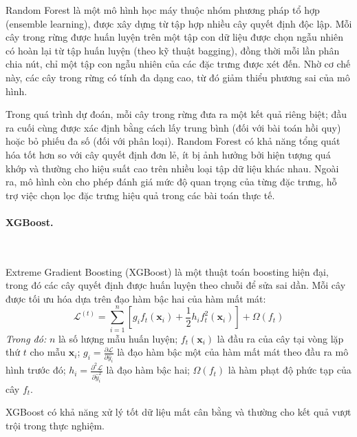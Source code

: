 \vspace{0.5em}

Random Forest là một mô hình học máy thuộc nhóm phương pháp tổ hợp (ensemble learning), được xây dựng từ tập hợp nhiều cây quyết định độc lập. Mỗi cây trong rừng được huấn luyện trên một tập con dữ liệu được chọn ngẫu nhiên có hoàn lại từ tập huấn luyện (theo kỹ thuật bagging), đồng thời mỗi lần phân chia nút, chỉ một tập con ngẫu nhiên của các đặc trưng được xét đến. Nhờ cơ chế này, các cây trong rừng có tính đa dạng cao, từ đó giảm thiểu phương sai của mô hình.

Trong quá trình dự đoán, mỗi cây trong rừng đưa ra một kết quả riêng biệt; đầu ra cuối cùng được xác định bằng cách lấy trung bình (đối với bài toán hồi quy) hoặc bỏ phiếu đa số (đối với phân loại). Random Forest có khả năng tổng quát hóa tốt hơn so với cây quyết định đơn lẻ, ít bị ảnh hưởng bởi hiện tượng quá khớp và thường cho hiệu suất cao trên nhiều loại tập dữ liệu khác nhau. Ngoài ra, mô hình còn cho phép đánh giá mức độ quan trọng của từng đặc trưng, hỗ trợ việc chọn lọc đặc trưng hiệu quả trong các bài toán thực tế.


\vspace{0.5em}

\paragraph{XGBoost.}~

\vspace{0.5em}

Extreme Gradient Boosting (XGBoost) là một thuật toán boosting hiện đại, trong đó các cây quyết định được huấn luyện theo chuỗi để sửa sai dần. Mỗi cây được tối ưu hóa dựa trên đạo hàm bậc hai của hàm mất mát:
\[
\mathcal{L}^{(t)} = \sum_{i=1}^n \left[ g_i f_t(\mathbf{x}_i) + \frac{1}{2} h_i f_t^2(\mathbf{x}_i) \right] + \Omega(f_t)
\]
\textit{Trong đó:}  
$n$ là số lượng mẫu huấn luyện;  
$f_t(\mathbf{x}_i)$ là đầu ra của cây tại vòng lặp thứ $t$ cho mẫu $\mathbf{x}_i$;  
$g_i = \frac{\partial \mathcal{L}}{\partial \hat{y}_i}$ là đạo hàm bậc một của hàm mất mát theo đầu ra mô hình trước đó;  
$h_i = \frac{\partial^2 \mathcal{L}}{\partial \hat{y}_i^2}$ là đạo hàm bậc hai;  
$\Omega(f_t)$ là hàm phạt độ phức tạp của cây $f_t$.


XGBoost có khả năng xử lý tốt dữ liệu mất cân bằng và thường cho kết quả vượt trội trong thực nghiệm.

\vspace{0.5em}

